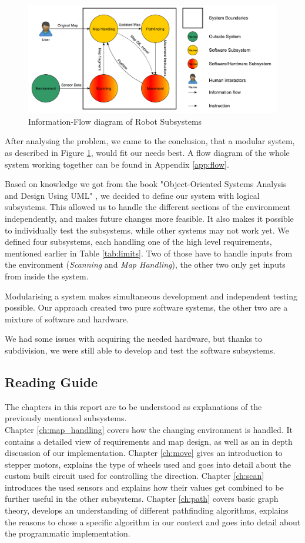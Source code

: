 \begin{figure}[!ht]
	\centering
	\includegraphics[width=\textwidth]{figures/intro/systemview}
	\caption{Information-Flow diagram of Robot Subsystems}
	\label{fig:system} 
\end{figure}
After analysing the problem,
we came to the conclusion,
that a modular system,
as described in Figure \ref{fig:system},
would fit our needs best.
A flow diagram of the whole system working together can be found in Appendix \ref{app:flow}.

Based on knowledge we got from the book
"Object-Oriented Systems Analysis and Design  Using UML" \cite{Benett2010},
we decided to define our system with logical subsystems.
This allowed us to handle the different sections of the environment independently,
and makes future changes more feasible.
It also makes it possible to individually test the subsystems,
while other systems may not work yet.
We defined four subsystems, each handling one of the high level requirements,
mentioned earlier in Table \ref{tab:limits}.
Two of those have to handle inputs from the environment (\emph{Scanning} and \emph{Map Handling}),
the other two only get inputs from inside the system.

Modularising a system makes simultaneous development
and independent testing possible.
Our approach created two pure software systems,
the other two are a mixture of software and hardware.

We had some issues with acquiring the needed hardware,
but thanks to subdivision,
we were still able to develop and test the software subsystems.

\subsection*{Reading Guide}
The chapters in this report are to be understood as explanations of the previously mentioned subsystems.\\
Chapter \ref{ch:map_handling} covers how the changing environment is handled.
It contains a detailed view of requirements and map design,
as well as an in depth discussion of our implementation.
Chapter \ref{ch:move} gives an introduction to stepper motors, explains the type of wheels used and goes into detail about the custom built circuit used for controlling the direction.
Chapter \ref{ch:scan} introduces the used sensors and 
explains how their values get combined to be further useful in the other subsystems.
Chapter \ref{ch:path} covers basic graph theory,
develops an understanding of different pathfinding algorithms,
explains the reasons to chose a specific algorithm in our context and
goes into detail about the programmatic implementation.

